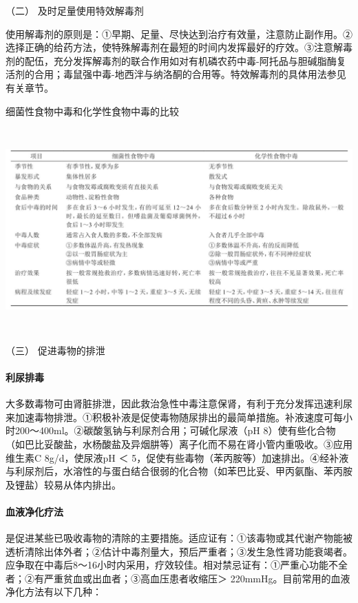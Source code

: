 \hypertarget{text00130.htmlux5cux23CHP5-1-3-2-2}{}
（二） 及时足量使用特效解毒剂

使用解毒剂的原则是：①早期、足量、尽快达到治疗有效量，注意防止副作用。②选择正确的给药方法，使特殊解毒剂在最短的时间内发挥最好的疗效。③注意解毒剂的配伍，充分发挥解毒剂的联合作用如对有机磷农药中毒-阿托品与胆碱脂酶复活剂的合用；毒鼠强中毒-地西泮与纳洛酮的合用等。特效解毒剂的具体用法参见有关章节。

\begin{table}[htbp]
\centering
\caption{细菌性食物中毒和化学性食物中毒的比较}
\label{tab53-1}
\includegraphics[width=6.64583in,height=3.07292in]{./images/Image00180.jpg}
\end{table}

\hypertarget{text00130.htmlux5cux23CHP5-1-3-2-3}{}
（三） 促进毒物的排泄

\paragraph{利尿排毒}

大多数毒物可由肾脏排泄，因此救治急性中毒注意保肾，有利于充分发挥迅速利尿来加速毒物排泄。①积极补液是促使毒物随尿排出的最简单措施。补液速度可每小时200～400ml。②碳酸氢钠与利尿剂合用；可碱化尿液（pH
8）使有些化合物（如巴比妥酸盐，水杨酸盐及异烟肼等）离子化而不易在肾小管内重吸收。③应用维生素C
8g/d，使尿液pH ＜
5，促使有些毒物（苯丙胺等）加速排出。④经补液与利尿剂后，水溶性的与蛋白结合很弱的化合物（如苯巴比妥、甲丙氨酯、苯丙胺及锂盐）较易从体内排出。

\paragraph{血液净化疗法}

是促进某些已吸收毒物的清除的主要措施。适应证有：①该毒物或其代谢产物能被透析清除出体外者；②估计中毒剂量大，预后严重者；③发生急性肾功能衰竭者。应争取在中毒后8～16小时内采用，疗效较佳。相对禁忌证有：①严重心功能不全者；②有严重贫血或出血者；③高血压患者收缩压＞
220mmHg。目前常用的血液净化方法有以下几种：


